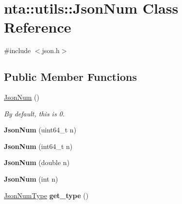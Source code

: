 \hypertarget{classnta_1_1utils_1_1JsonNum}{}\section{nta\+:\+:utils\+:\+:Json\+Num Class Reference}
\label{classnta_1_1utils_1_1JsonNum}


{\ttfamily \#include $<$json.\+h$>$}

\subsection*{Public Member Functions}
\begin{DoxyCompactItemize}
\item 
\mbox{\label{classnta_1_1utils_1_1JsonNum_a4c16668854577689d9ae6e6a9f7fd62d}} 
\hyperlink{classnta_1_1utils_1_1JsonNum_a4c16668854577689d9ae6e6a9f7fd62d}{Json\+Num} ()
\begin{DoxyCompactList}\small\item\em By default, this is 0. \end{DoxyCompactList}\item 
\mbox{\label{classnta_1_1utils_1_1JsonNum_a2a17dbe70a84cd8d202b6ad5b865ec28}} 
{\bfseries Json\+Num} (uint64\+\_\+t n)
\item 
\mbox{\label{classnta_1_1utils_1_1JsonNum_a30dcf42823f7d99800c2eac63fdd8026}} 
{\bfseries Json\+Num} (int64\+\_\+t n)
\item 
\mbox{\label{classnta_1_1utils_1_1JsonNum_a94ecf5200ab6caa555850d96441dae29}} 
{\bfseries Json\+Num} (double n)
\item 
\mbox{\label{classnta_1_1utils_1_1JsonNum_ae4cd0552c7196301f7adf62394ad7e0c}} 
{\bfseries Json\+Num} (int n)
\item 
\mbox{\label{classnta_1_1utils_1_1JsonNum_a9df08dcba9a39706221cd215a295f16c}} 
\hyperlink{namespacenta_1_1utils_a83ee7c4cfccd9fa43564f5fe1c0c77d3}{Json\+Num\+Type} {\bfseries get\+\_\+type} ()
\item 
\mbox{\label{classnta_1_1utils_1_1JsonNum_a89e8033a247c3342d99a762f6110d877}} 

\end{DoxyCompactItemize}
